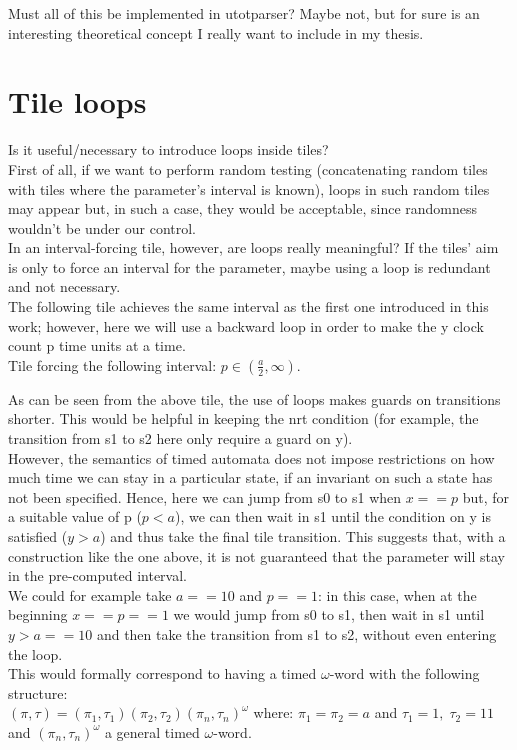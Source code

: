 \documentclass[12pt, a4paper]{article}
\begin{document}
\noindent
Must all of this be implemented in utotparser? Maybe not, but for sure is an interesting theoretical concept I really want to include in my thesis.

\newpage

\section{Tile loops}

\noindent
Is it useful/necessary to introduce loops inside tiles?\\
First of all, if we want to perform random testing (concatenating random tiles with tiles where the parameter's interval is known), loops in such random tiles may appear but, in such a case, they would be acceptable, since randomness wouldn't be under our control.\\

\noindent
In an interval-forcing tile, however, are loops really meaningful? If the tiles' aim is only to force an interval for the parameter, maybe using a loop is redundant and not necessary.\\

\noindent
The following tile achieves the same interval as the first one introduced in this work; however, here we will use a backward loop in order to make the y clock count p time units at a time.\\

Tile forcing the following interval: $p \in (\frac{a}{2}, \infty)$.



\noindent
As can be seen from the above tile, the use of loops makes guards on transitions shorter. This would be helpful in keeping the nrt condition (for example, the transition from s1 to s2 here only require a guard on y).\\

\noindent
However, the semantics of timed automata does not impose restrictions on how much time we can stay in a particular state, if an invariant on such a state has not been specified. Hence, here we can jump from s0 to s1 when $x == p$ but, for a suitable value of p ($p < a$), we can then wait in s1 until the condition on y is satisfied ($y > a$) and thus take the final tile transition. This suggests that, with a construction like the one above, it is not guaranteed that the parameter will stay in the pre-computed interval.\\

\noindent
We could for example take $a == 10$ and $p == 1$: in this case, when at the beginning $x == p == 1$ we would jump from s0 to s1, then wait in s1 until $y > a == 10$ and then take the transition from s1 to s2, without even entering the loop.\\
This would formally correspond to having a timed $\omega$-word with the following structure:\\
$(\pi, \tau) = (\pi_{1}, \tau_{1}) (\pi_{2}, \tau_{2}) (\pi_{n}, \tau_{n})^{\omega}$ where: $\pi_{1} = \pi_{2} = a$ and $\tau_{1} = 1, \; \tau_{2} = 11$ and $(\pi_{n}, \tau_{n})^{\omega}$ a general timed $\omega$-word.\\
\end{document}
